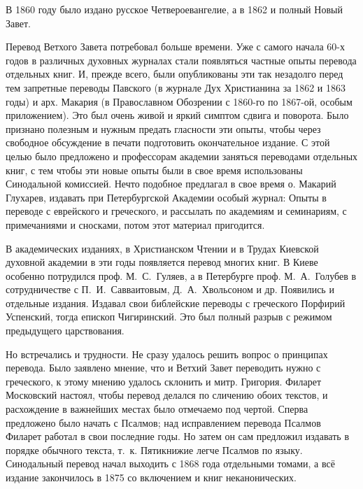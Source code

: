 В 1860 году было издано русское Четвероевангелие, а в 1862 и полный
Новый Завет.

Перевод Ветхого Завета потребовал больше времени. Уже с самого начала
60-х годов в различных духовных журналах стали появляться частные опыты
перевода отдельных книг.
И, прежде всего, были опубликованы эти так незадолго перед тем запретные
переводы Павского (в журнале Дух Христианина за 1862 и 1863 годы) и
арх. Макария (в Православном Обозрении с 1860-го по 1867-ой, особым
приложением).
Это был очень живой и яркий симптом сдвига и поворота.
Было признано полезным и нужным предать гласности эти опыты, чтобы через
свободное обсуждение в печати подготовить окончательное издание.
С этой целью было предложено и профессорам академии заняться переводами
отдельных книг, с тем чтобы эти новые опыты были в свое время использованы
Синодальной комиссией.
Нечто подобное предлагал в свое время о. Макарий Глухарев,
издавать при Петербургской Академии особый журнал: Опыты в переводе с
еврейского и греческого, и рассылать по академиям и семинариям, с
примечаниями и сносками, потом этот материал пригодится.

В академических изданиях, в Христианском Чтении и в Трудах Киевской
духовной академии в эти годы появляется перевод многих книг.
В Киеве особенно потрудился проф. М.~С.~Гуляев, а в Петербурге проф.
М.~А.~Голубев в сотрудничестве с П.~И.~Савваитовым, Д.~А.~Хвольсоном и др.
Появились и отдельные издания.
Издавал свои библейские переводы с греческого Порфирий Успенский, тогда епископ
Чигиринский.
Это был полный разрыв с режимом предыдущего царствования.

Но встречались и трудности.
Не сразу удалось решить вопрос о принципах перевода.
Было заявлено мнение, что и Ветхий Завет переводить нужно с греческого,
к этому мнению удалось склонить и митр. Григория.
Филарет Московский настоял, чтобы перевод делался по сличению обоих
текстов, и расхождение в важнейших местах было отмечаемо под чертой.
Сперва предложено было начать с Псалмов; над исправлением перевода
Псалмов Филарет работал в свои последние годы.
Но затем он сам предложил издавать в порядке обычного текста,
т.~к. Пятикнижие легче Псалмов по языку.
Синодальный перевод начал выходить с 1868 года отдельными томами, а
всё издание закончилось в 1875 со включением и книг неканонических.

